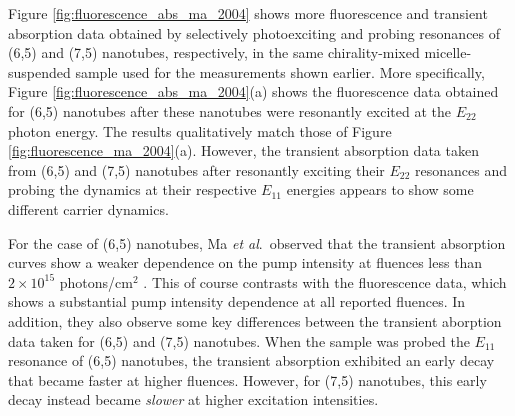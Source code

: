 Figure \ref{fig:fluorescence_abs_ma_2004} shows more fluorescence and transient absorption data obtained by selectively photoexciting and probing resonances of (6,5) and (7,5) nanotubes, respectively, in the same chirality-mixed micelle-suspended sample used for the measurements shown earlier. More specifically, Figure \ref{fig:fluorescence_abs_ma_2004}(a) shows the fluorescence data obtained for (6,5) nanotubes after these nanotubes were resonantly excited at the $E_{22}$ photon energy. The results qualitatively match those of Figure \ref{fig:fluorescence_ma_2004}(a). However, the transient absorption data taken from (6,5) and (7,5) nanotubes after resonantly exciting their $E_{22}$ resonances and probing the dynamics at their respective $E_{11}$ energies appears to show some different carrier dynamics.

For the case of (6,5) nanotubes, Ma \textit{et al}.\ observed that the transient absorption curves show a weaker dependence on the pump intensity at fluences less than $2 \times 10^{15}$ photons/cm$^2$ \cite{ma2004ultrafast}. This of course contrasts with the fluorescence data, which shows a substantial pump intensity dependence at all reported fluences. In addition, they also observe some key differences between the transient aborption data taken for (6,5) and (7,5) nanotubes. When the sample was probed the $E_{11}$ resonance of (6,5) nanotubes, the transient absorption exhibited an early decay that became faster at higher fluences. However, for (7,5) nanotubes, this early decay instead became \textit{slower} at higher excitation intensities.

